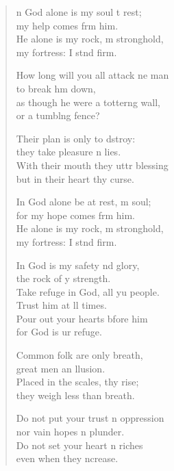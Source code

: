 \settowidth{\versewidth}{How long will you all attack one man *}
\begin{verse}%
  \begin{patverse}
n God alone is my soul t rest;\Med\\
my help comes frm him.\\
He alone is my rock, m stronghold,\Med\\
my fortress: I stnd firm.

How long will you all attack ne man\Med\\
to break h\pointup{\i}m down,\\
as though he were a totter\pointup{\i}ng wall,\Med\\
or a tumbl\pointup{\i}ng fence?

Their plan is only to dstroy:\Med\\
they take pleasure \pointup{\i}n lies.\\
With their mouth they uttr blessing\Med\\
but in their heart thy curse.

In God alone be at rest, m soul;\Med\\
for my hope comes frm him.\\
He alone is my rock, m stronghold,\Med\\
my fortress: I stnd firm.

In God is my safety nd glory,\Med\\
the rock of y strength.\\
Take refuge in God, all yu people.\Med\\
Trust him at ll times.\\
Pour out your hearts bfore him\Med\\
for God is ur refuge.

Common folk are only  breath,\Med\\
great men an \pointup{\i}llusion.\\
Placed in the scales, thy rise;\Med\\
they weigh less than  breath.

Do not put your trust \pointup{\i}n oppression\Med\\
nor vain hopes n plunder.\\
Do not set your heart n riches\Med\\
even when they \pointup{\i}ncrease.


\end{patverse}
\end{verse}
